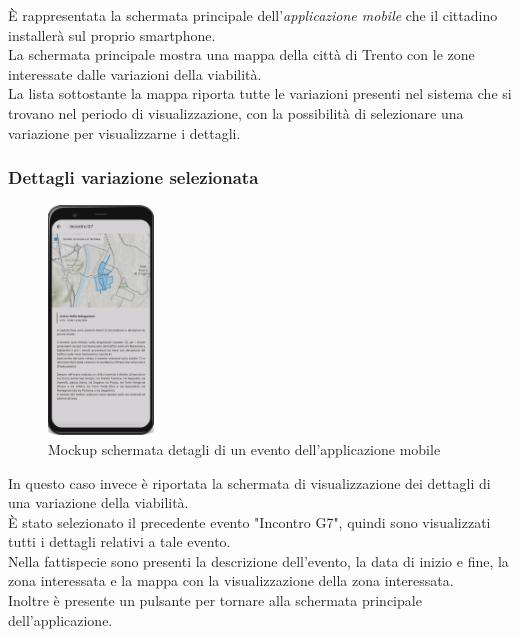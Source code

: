 \documentclass{article}
\begin{document}
È rappresentata la schermata principale dell'\textit{applicazione mobile} che il cittadino installerà sul proprio smartphone.\\
La schermata principale mostra una mappa della città di Trento con le zone interessate dalle variazioni della viabilità.\\
La lista sottostante la mappa riporta tutte le variazioni presenti nel sistema che si trovano nel periodo di visualizzazione, con la possibilità di selezionare una variazione per visualizzarne i dettagli.\\
\clearpage

\subsubsection{Dettagli variazione selezionata}
\begin{figure}[htbp]
    \label{fig:Dettaglio_evento}
    \centering
    \includegraphics[width=0.25\textwidth]{Images/Mockup2 - Mobile.png}
    \caption{Mockup schermata detagli di un evento dell'applicazione mobile}
\end{figure}

In questo caso invece è riportata la schermata di visualizzazione dei dettagli di una variazione della viabilità.\\
È stato selezionato il precedente evento "Incontro G7", quindi sono visualizzati tutti i dettagli relativi a tale evento.\\
Nella fattispecie sono presenti la descrizione dell'evento, la data di inizio e fine, la zona interessata e la mappa con la visualizzazione della zona interessata.\\
Inoltre è presente un pulsante per tornare alla schermata principale dell'applicazione.\\
\clearpage
\end{document}
